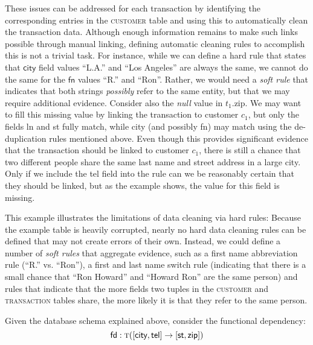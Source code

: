These issues can be addressed for each transaction by identifying the corresponding entries in the \textsc{customer} table and using this to automatically clean the transaction data. Although enough information remains to make such links possible through manual linking, defining automatic cleaning rules to accomplish this is not a trivial task. For instance, while we can define a hard rule that states that $\textsf{city}$ field values ``L.A.'' and 
``Los Angeles'' are always the same, we cannot do the same for the $\textsf{fn}$ values ``R.'' and 
``Ron''. Rather, we would need a \emph{soft rule} that indicates that both strings \emph{possibly} refer 
to the same entity, but that we may require additional evidence. Consider also the \emph{null} value in $t_1.$\textsf{zip}. We may want to fill this missing value by linking 
the transaction to customer $c_1$, but only the fields \textsf{ln} and \textsf{st} fully match, while 
\textsf{city} (and possibly \textsf{fn}) may match using the de-duplication rules mentioned above. Even 
though this provides significant evidence that the transaction should be linked to customer $c_1$, 
there is still a chance that two different people share the same last name and street address in a large 
city. Only if we include the \textsf{tel} field into the rule can we be reasonably certain that they 
should be linked, but as the example shows, the value for this field is missing. 

This example illustrates the limitations of data cleaning via hard rules: Because the example table is 
heavily corrupted, nearly no hard data cleaning rules can be defined that may not create errors of their 
own. Instead, we could define a number of \emph{soft rules} that aggregate evidence, such as a first 
name abbreviation rule (``R.'' vs. ``Ron''), a first and last name switch rule (indicating that there is a 
small chance that ``Ron Howard'' and ``Howard Ron'' are the same person) and rules that indicate that 
the more fields two tuples in the \textsc{customer} and \textsc{transaction} tables share, the more likely 
it is that they refer to the same person. 

Given the database schema explained above, consider the functional dependency: 
\begin{equation*}
\textsf{fd}: \textsc{t}([\textsf{city}, \textsf{tel}] \rightarrow [\textsf{st}, \textsf{zip}])
\end{equation*}
\vspace{-2em}

